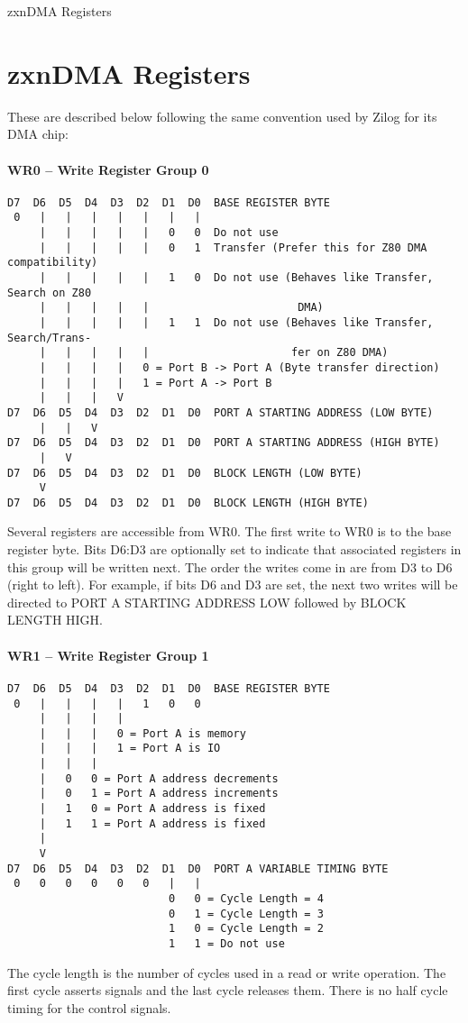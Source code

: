 \begin{table}[h]\centering
  \caption{zxnDMA Registers}
\end{table}

\section{zxnDMA Registers}
These are described below following the same convention used by Zilog
for its DMA chip:

\paragraph{WR0 – Write Register Group 0}
\begin{verbatim}
D7  D6  D5  D4  D3  D2  D1  D0  BASE REGISTER BYTE
 0   |   |   |   |   |   |   |
     |   |   |   |   |   0   0  Do not use
     |   |   |   |   |   0   1  Transfer (Prefer this for Z80 DMA compatibility)
     |   |   |   |   |   1   0  Do not use (Behaves like Transfer, Search on Z80
     |   |   |   |   |                       DMA)
     |   |   |   |   |   1   1  Do not use (Behaves like Transfer, Search/Trans-
     |   |   |   |   |                      fer on Z80 DMA)
     |   |   |   |   0 = Port B -> Port A (Byte transfer direction)
     |   |   |   |   1 = Port A -> Port B
     |   |   |   V
D7  D6  D5  D4  D3  D2  D1  D0  PORT A STARTING ADDRESS (LOW BYTE)
     |   |   V
D7  D6  D5  D4  D3  D2  D1  D0  PORT A STARTING ADDRESS (HIGH BYTE)
     |   V
D7  D6  D5  D4  D3  D2  D1  D0  BLOCK LENGTH (LOW BYTE)
     V
D7  D6  D5  D4  D3  D2  D1  D0  BLOCK LENGTH (HIGH BYTE)
\end{verbatim}
Several registers are accessible from WR0. The first write to WR0 is
to the base register byte. Bits D6:D3 are optionally set to indicate
that associated registers in this group will be written next. The
order the writes come in are from D3 to D6 (right to left). For
example, if bits D6 and D3 are set, the next two writes will be
directed to PORT A STARTING ADDRESS LOW followed by BLOCK LENGTH HIGH.

\paragraph{WR1 – Write Register Group 1}
\begin{verbatim}
D7  D6  D5  D4  D3  D2  D1  D0  BASE REGISTER BYTE
 0   |   |   |   |   1   0   0
     |   |   |   |
     |   |   |   0 = Port A is memory
     |   |   |   1 = Port A is IO
     |   |   |
     |   0   0 = Port A address decrements
     |   0   1 = Port A address increments
     |   1   0 = Port A address is fixed
     |   1   1 = Port A address is fixed
     |
     V
D7  D6  D5  D4  D3  D2  D1  D0  PORT A VARIABLE TIMING BYTE
 0   0   0   0   0   0   |   |
                         0   0 = Cycle Length = 4
                         0   1 = Cycle Length = 3
                         1   0 = Cycle Length = 2
                         1   1 = Do not use
\end{verbatim}
The cycle length is the number of cycles used in a read or write
 operation. The first cycle asserts signals and the last cycle
 releases them. There is no half cycle timing for the control signals.

